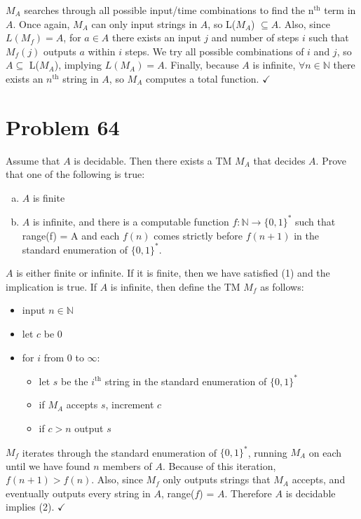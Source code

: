 \documentclass[11pt]{article}
\let\imp\rightarrow
\begin{document}
$M_A$ searches through all possible input/time combinations to find the n$^{\text{th}}$ term in $A$.
Once again, $M_A$ can only input strings in $A$, so L($M_A$) $\subseteq A$.
Also, since $L(M_f) = A$, for $a \in A$ there exists an input $j$ and number of steps $i$ such that $M_f(j)$ outputs $a$ within $i$ steps.
We try all possible combinations of $i$ and $j$, so $A \subseteq$ L($M_A$), implying $L(M_A) = A$.
Finally, because $A$ is infinite, $\forall n \in \mathbb{N}$ there exists an $n^{\text{th}}$ string in $A$, so $M_A$ computes a total function. $\checkmark$

\section*{Problem 64}

Assume that $A$ is decidable. 
Then there exists a TM $M_A$ that decides $A$.
Prove that one of the following is true:
\begin{enumerate}[(a)]
	\item $A$ is finite
	\item $A$ is infinite, and there is a computable function $f: \mathbb{N} \imp \{0,1\}^*$ such that range(f) = A and each $f(n)$ comes strictly before $f(n+1)$ in the standard enumeration of $\{0,1\}^*$.
\end{enumerate}

$A$ is either finite or infinite.
If it is finite, then we have satisfied (1) and the implication is true.
If $A$ is infinite, then define the TM $M_f$ as follows:
\begin{itemize}
	\item input $n \in \mathbb{N}$
	\item let $c$ be 0
	\item for $i$ from 0 to $\infty$:
	\begin{itemize}
		\item let $s$ be the $i^{\text{th}}$ string in the standard enumeration of $\{0,1\}^*$
		\item if $M_A$ accepts $s$, increment $c$
		\item if $c > n$ output $s$
	\end{itemize}
\end{itemize}

$M_f$ iterates through the standard enumeration of $\{0,1\}^*$, running $M_A$ on each until we have found $n$ members of $A$.
Because of this iteration, $f( n+ 1) > f(n)$.
Also, since $M_f$ only outputs strings that $M_A$ accepts, and eventually outputs every string in $A$, range($f$) = $A$.
Therefore $A$ is decidable implies (2). $\checkmark$
\end{document}
